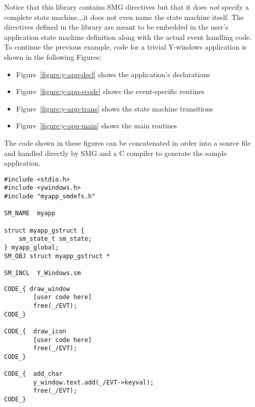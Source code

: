 Notice that this library contains SMG directives but that it does {\em
not} specify a complete state machine...it does not even name the state
machine itself.  The directives defined in the library are meant to be
embedded in the user's application state machine definition along with
the actual event handling code.  To continue the previous example, code
for a trivial Y-windows application is shown in the following Figures:

\begin{itemize}
\item Figure~\ref{figure:y-app-decl} shows the application's declarations
\item Figure~\ref{figure:y-app-ecode} shows the event-specific routines
\item Figure~\ref{figure:y-app-trans} shows the state machine transitions
\item Figure~\ref{figure:y-app-main} shows the main routines
\end{itemize}

The code shown in these figures can be concatenated in order into a
 source file and handled directly by SMG and a C compiler to
generate the sample application.

\begin{figure*}[h]
\begin{verbatim}
#include <stdio.h>
#include <ywindows.h>
#include "myapp_smdefs.h"

SM_NAME  myapp

struct myapp_gstruct {
    sm_state_t sm_state;
} myapp_global;
SM_OBJ struct myapp_gstruct *

SM_INCL  Y_Windows.sm
\end{verbatim}
\caption{Y-windows Application declarations}\label{figure:y-app-decl}
\end{figure*}

\begin{figure*}
\begin{verbatim}
CODE_{ draw_window
        [user code here]
        free(_/EVT);
CODE_}

CODE_{  draw_icon
        [user code here]
        free(_/EVT);
CODE_}

CODE_{  add_char
        y_window.text.add(_/EVT->keyval);
        free(_/EVT);
CODE_}
\end{verbatim}
\caption{Y-windows Application event handling routines}\label{figure:y-app-ecode}
\end{figure*}


